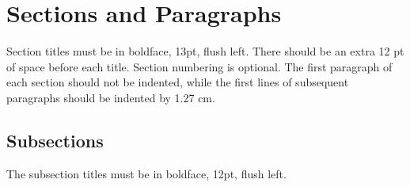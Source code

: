 \documentclass[12pt]{article}
\begin{document}
\section{Sections and Paragraphs}

Section titles must be in boldface, 13pt, flush left. There should be an extra
12 pt of space before each title. Section numbering is optional. The first
paragraph of each section should not be indented, while the first lines of
subsequent paragraphs should be indented by 1.27 cm.

\subsection{Subsections}

The subsection titles must be in boldface, 12pt, flush left.

%
%
%
%
%
%
%
\end{document}
